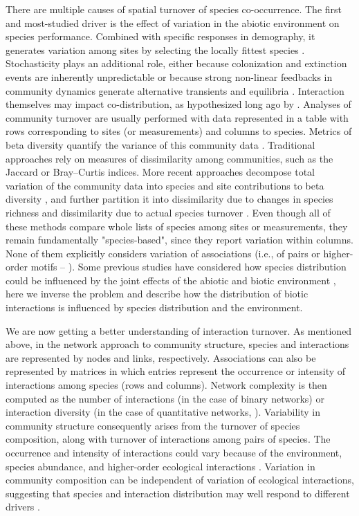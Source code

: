 \documentclass[12pt]{article}
\begin{document}
There are multiple causes of spatial turnover of species co-occurrence. The
first and most-studied driver is the effect of variation in the abiotic
environment on species performance. Combined with specific responses in
demography, it generates variation among sites by selecting the locally
fittest species \citep{Leibold2004a}. Stochasticity plays an additional role,
either because colonization and extinction events \citep{Hanski1999} are
inherently unpredictable or because strong non-linear feedbacks in community
dynamics generate alternative transients and equilibria \citep{Chase2007,
Vellend2014}. Interaction themselves may impact co-distribution, as
hypothesized long ago by \citet{Diamond1975}. Analyses of community turnover
are usually performed with data represented in a table with rows corresponding
to sites (or measurements) and columns to species. Metrics of beta diversity
quantify the variance of this community data \citep{Legendre2005}. Traditional
approaches rely on measures of dissimilarity among communities, such as the
Jaccard or Bray–Curtis indices. More recent approaches decompose total
variation of the community data into species and site contributions to beta
diversity \citep{Legendre2013}, and further partition it into dissimilarity
due to changes in species richness and dissimilarity due to actual species
turnover \citep{Baselga2010}. Even though all of these methods compare whole
lists of species among sites or measurements, they remain fundamentally
"species-based", since they report variation within columns. None of them
explicitly considers variation of associations (i.e., of pairs or higher-order
motifs – \citealt{Stouffer2007}). Some previous studies have considered how
species distribution could be influenced by the joint effects of the abiotic
and biotic environment \citep{Stephens2009, GonzalezSalazar2013, Cazelles2015,
Ovaskainen2017}, here we inverse the problem and describe how the distribution
of biotic interactions is influenced by species distribution and the
environment.

We are now getting a better understanding of interaction turnover. As
mentioned above, in the network approach to community structure, species and
interactions are represented by nodes and links, respectively. Associations
can also be represented by matrices in which entries represent the occurrence
or intensity of interactions among species (rows and columns). Network
complexity is then computed as the number of interactions (in the case of
binary networks) or interaction diversity (in the case of quantitative
networks, \citealt{Bersier2002}). Variability in community structure
consequently arises from the turnover of species composition, along with
turnover of interactions among pairs of species. The occurrence and intensity
of interactions could vary because of the environment, species abundance, and
higher-order ecological interactions \citep{Poisot2015a}. Variation in community
composition can be independent of variation of ecological
interactions, suggesting that species and interaction distribution may well
respond to different drivers \citep{Poisot2012}.
\end{document}

